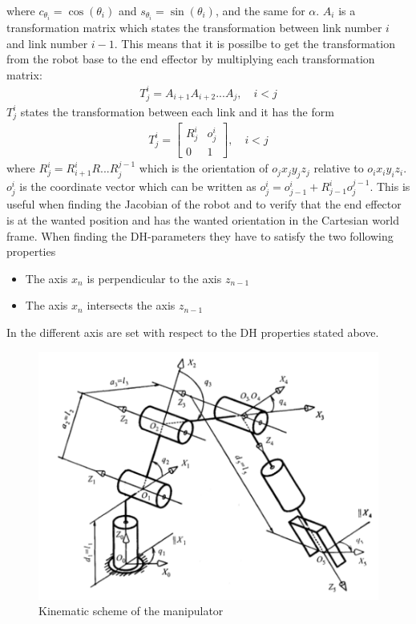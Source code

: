 where $c_{\theta_i} = \cos{(\theta_i)}$ and $s_{\theta_i} = \sin{(\theta_i)}$, and the same for $\alpha$. $A_i$ is a transformation matrix which states the transformation between link number $i$ and link number $i-1$. This means that it is possilbe to get the transformation from the robot base to the end effector by multiplying each transformation matrix:
\begin{align*}
    T^i_j = A_{i+1}A_{i+2}...A_j, \quad i<j
\end{align*}
 $T^i_j$ states the transformation between each link and it has the form
 \begin{align*}
      T^i_j = 
      \begin{bmatrix}
          R^i_j & o^i_j\\
          0&1
      \end{bmatrix}, \quad i<j
 \end{align*}
 where $R^i_j = R^i_{i+1}R...R^{j-1}_j$ which is the orientation of $o_jx_jy_jz_j$ relative to $o_ix_iy_iz_i$. $o^i_j$ is the coordinate vector which can be written as $o^i_j = o^i_{j-1}+R^{i}_{j-1}o^{j-1}_j$. This is useful when finding the Jacobian of the robot and to verify that the end effector is at the wanted position and has the wanted orientation in the Cartesian world frame. When finding the DH-parameters they have to satisfy the two following properties \cite{spong}
 \begin{itemize}
     \item The axis $x_n$ is perpendicular to the axis $z_{n-1}$
     \item The axis $x_n$ intersects the axis $z_{n-1}$
 \end{itemize}
In  the different axis are set with respect to the DH properties stated above\cite{Kinematics}. 
\begin{figure}[htbp]
  \centering
  \includegraphics[width=.9\textwidth]{img/DHconv.png}
  \caption{Kinematic scheme of the manipulator\cite{Kinematics}}
  \label{fig:dhf}
\end{figure}
